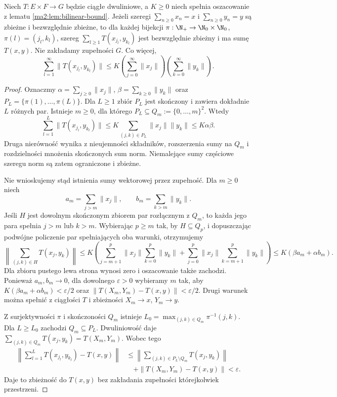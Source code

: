 \begin{wniosek}
\label{ma2:cor:bilinear-pair-enumeration}
Niech $T:E\times F\to G$ będzie ciągłe dwuliniowe,
a $K\ge0$ niech spełnia oszacowanie z lematu
\ref{ma2:lem:bilinear-bound}.
Jeżeli szeregi $\sum_{n\ge0}x_n=x$ i $\sum_{n\ge0}y_n=y$
są zbieżne i bezwzględnie zbieżne, to dla każdej bijekcji
$\pi:\N_+\to\N_0\times\N_0$, $\pi(l)=(j_l,k_l)$,
szereg $\sum_{l\ge1}T(x_{j_l},y_{k_l})$ jest bezwzględnie
zbieżny i ma sumę $T(x,y)$. Nie zakładamy zupełności $G$.
Co więcej,
\[
 \sum_{l=1}^\infty\|T(x_{j_l},y_{k_l})\|
 \le K\left(\sum_{j=0}^\infty\|x_j\|\right)
      \left(\sum_{k=0}^\infty\|y_k\|\right).
\]
\end{wniosek}
\begin{proof}
Oznaczmy $\alpha=\sum_{j\ge0}\|x_j\|$,
$\beta=\sum_{k\ge0}\|y_k\|$ oraz
$P_L=\{\pi(1),\ldots,\pi(L)\}$.
Dla $L\ge1$ zbiór $P_L$ jest skończony i zawiera
dokładnie $L$ różnych par. Istnieje $m\ge0$, dla którego
$P_L\subseteq Q_m:=\{0,\ldots,m\}^2$.
Wtedy
\[
 \sum_{l=1}^L\|T(x_{j_l},y_{k_l})\|
 \le K\sum_{(j,k)\in P_L}\|x_j\|\|y_k\|
 \le K\alpha\beta.
\]
Druga nierówność wynika z nieujemności składników,
rozszerzenia sumy na $Q_m$ i rozdzielności mnożenia
skończonych sum norm. Niemalejące sumy częściowe
szeregu norm są zatem ograniczone i zbieżne.

Nie wnioskujemy stąd istnienia sumy wektorowej przez
zupełność. Dla $m\ge0$ niech
\[
 a_m=\sum_{j>m}\|x_j\|,\qquad b_m=\sum_{k>m}\|y_k\|.
\]
Jeśli $H$ jest dowolnym skończonym zbiorem par
rozłącznym z $Q_m$, to każda jego para spełnia
$j>m$ lub $k>m$. Wybierając $p\ge m$ tak, by
$H\subseteq Q_p$, i dopuszczając podwójne policzenie
par spełniających oba warunki, otrzymujemy
\[
 \left\|\sum_{(j,k)\in H}T(x_j,y_k)\right\|
 \le K\left(
  \sum_{j=m+1}^p\|x_j\|\sum_{k=0}^p\|y_k\|
 +\sum_{j=0}^p\|x_j\|\sum_{k=m+1}^p\|y_k\|
 \right)
 \le K(\beta a_m+\alpha b_m).
\]
Dla zbioru pustego lewa strona wynosi zero i oszacowanie
także zachodzi. Ponieważ $a_m,b_m\to0$,
dla dowolnego $\varepsilon>0$ wybieramy $m$ tak, aby
$K(\beta a_m+\alpha b_m)<\varepsilon/2$ oraz
$\|T(X_m,Y_m)-T(x,y)\|<\varepsilon/2$.
Drugi warunek można spełnić z ciągłości $T$ i zbieżności
$X_m\to x$, $Y_m\to y$.

Z surjektywności $\pi$ i skończoności $Q_m$ istnieje
$L_0=\max_{(j,k)\in Q_m}\pi^{-1}(j,k)$.
Dla $L\ge L_0$ zachodzi $Q_m\subseteq P_L$.
Dwuliniowość daje
$\sum_{(j,k)\in Q_m}T(x_j,y_k)=T(X_m,Y_m)$.
Wobec tego
\[
\begin{aligned}
 \left\|\sum_{l=1}^L T(x_{j_l},y_{k_l})-T(x,y)\right\|
 &\le
 \left\|\sum_{(j,k)\in P_L\setminus Q_m}T(x_j,y_k)\right\|\\
 &\quad+\|T(X_m,Y_m)-T(x,y)\|<\varepsilon.
\end{aligned}
\]
Daje to zbieżność do $T(x,y)$ bez zakładania zupełności
którejkolwiek przestrzeni.
\end{proof}

